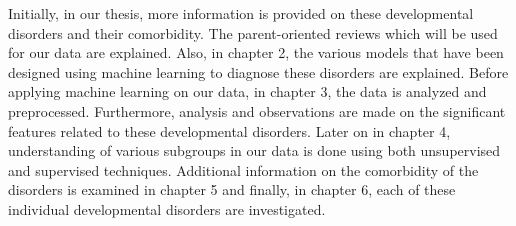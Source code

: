 Initially, in our thesis, more information is provided on these developmental disorders and their comorbidity. The parent-oriented reviews which will be used for our data are explained. Also, in chapter 2, the various models that have been designed using machine learning to diagnose these disorders are explained. Before applying machine learning on our data, in chapter 3, the data is analyzed and preprocessed. Furthermore, analysis and observations are made on the significant features related to these developmental disorders. Later on in chapter 4, understanding of various subgroups in our data is done using both unsupervised and supervised techniques. Additional information on the comorbidity of the disorders is examined in chapter 5 and finally, in chapter 6, each of these individual developmental disorders are investigated. 


